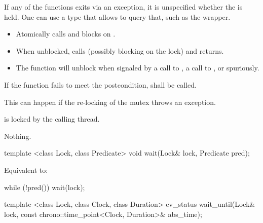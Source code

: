 \begin{itemdescr}
\pnum
\begin{note}
If any of the  functions exits via an exception, it is
unspecified whether the  is held. One can use a  type
that allows to query that, such as the  wrapper.
\end{note}

\pnum
\effects
\begin{itemize}
\item Atomically calls  and blocks on .
\item When unblocked, calls  (possibly blocking on the lock) and returns.
\item The function will unblock when signaled by a call to ,
a call to , or spuriously.
\end{itemize}

\pnum
\remarks
If the function fails to meet the postcondition, 
shall be called.
\begin{note} This can happen if the re-locking of the mutex throws an exception. \end{note}

\pnum\postconditions {} is locked by the calling thread.

\pnum\throws Nothing.

\end{itemdescr}

%
\begin{itemdecl}
template <class Lock, class Predicate>
  void wait(Lock& lock, Predicate pred);
\end{itemdecl}

\begin{itemdescr}
\pnum
\effects Equivalent to:
\begin{codeblock}
while (!pred())
  wait(lock);
\end{codeblock}
\end{itemdescr}

%
\begin{itemdecl}
template <class Lock, class Clock, class Duration>
  cv_status wait_until(Lock& lock, const chrono::time_point<Clock, Duration>& abs_time);
\end{itemdecl}

